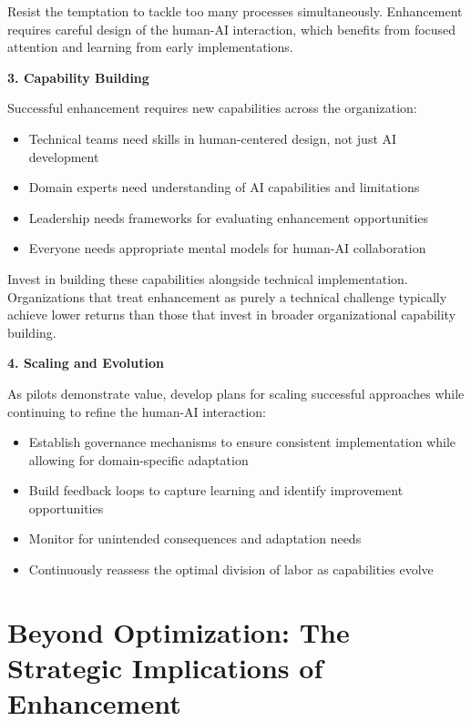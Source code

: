 \documentclass[
  Letterpaper,
]{scrbook}
\providecommand{\tightlist}{%
  \setlength{\itemsep}{0pt}\setlength{\parskip}{0pt}}\usepackage{longtable,booktabs,array}
\begin{document}
Resist the temptation to tackle too many processes simultaneously.
Enhancement requires careful design of the human-AI interaction, which
benefits from focused attention and learning from early implementations.

\textbf{3. Capability Building}

Successful enhancement requires new capabilities across the
organization:

\begin{itemize}
\tightlist
\item
  Technical teams need skills in human-centered design, not just AI
  development
\item
  Domain experts need understanding of AI capabilities and limitations
\item
  Leadership needs frameworks for evaluating enhancement opportunities
\item
  Everyone needs appropriate mental models for human-AI collaboration
\end{itemize}

Invest in building these capabilities alongside technical
implementation. Organizations that treat enhancement as purely a
technical challenge typically achieve lower returns than those that
invest in broader organizational capability building.

\textbf{4. Scaling and Evolution}

As pilots demonstrate value, develop plans for scaling successful
approaches while continuing to refine the human-AI interaction:

\begin{itemize}
\tightlist
\item
  Establish governance mechanisms to ensure consistent implementation
  while allowing for domain-specific adaptation
\item
  Build feedback loops to capture learning and identify improvement
  opportunities
\item
  Monitor for unintended consequences and adaptation needs
\item
  Continuously reassess the optimal division of labor as capabilities
  evolve
\end{itemize}

\section{Beyond Optimization: The Strategic Implications of
Enhancement}\label{beyond-optimization-the-strategic-implications-of-enhancement}
\end{document}
